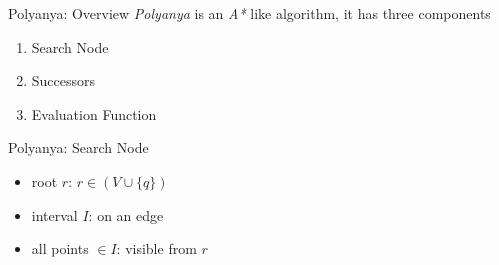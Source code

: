 \begin{frame}{Polyanya: Overview}
\textit{Polyanya} is an \textit{A*} like algorithm, it has three components
\begin{enumerate}
    \item Search Node
    \item Successors
    \item Evaluation Function
\end{enumerate}
\end{frame}

\begin{frame}{Polyanya: Search Node}

\begin{minipage}{.4\textwidth}
\begin{itemize}
    \item \small root $r$: $r \in (V \cup \{q\})$
    \item \small interval $I$: on an edge
    \item \small all points $\in I$: visible from $r$
\end{itemize}
\end{minipage}%
\begin{minipage}{.6\textwidth}
\begin{adjustbox}{max totalsize={.9\textwidth}{.9\textheight}, right}
\end{adjustbox}
\end{minipage}

\end{frame}

